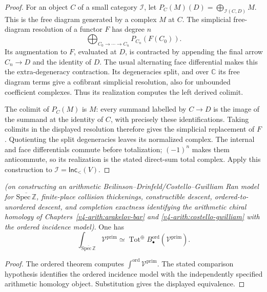 \begin{proof}
For an object \(C\) of a small category \(\mathcal I\), let
\(P_C(M)(D)=\bigoplus_{\mathcal I(C,D)}M\). This is the free
diagram generated by a complex \(M\) at \(C\). The simplicial
free-diagram resolution of a functor \(F\) has degree \(n\)
\[
 \bigoplus_{C_0\to\cdots\to C_n}P_{C_n}(F(C_0)).
\]
Its augmentation to \(F\), evaluated at \(D\), is contracted
by appending the final arrow \(C_n\to D\) and the identity
of \(D\). The usual alternating face differential makes this
the extra-degeneracy contraction. Its degeneracies split, and
over \(\mathbb C\) its free diagram terms give a cofibrant
simplicial resolution, also for unbounded coefficient complexes.
Thus its realization computes the left derived colimit.

The colimit of \(P_C(M)\) is \(M\): every summand labelled by
\(C\to D\) is the image of the summand at the identity of
\(C\), with precisely these identifications. Taking colimits in
the displayed resolution therefore gives the simplicial replacement
of \(F\). Quotienting the split degeneracies leaves its normalized
complex. The internal and face differentials commute before
totalization; \((-1)^n\) makes them anticommute, so its
realization is the stated direct-sum total complex. Apply this
construction to \(\mathcal I=\mathsf{Inc}_{<}(V)\).
\end{proof}

\begin{corollary}
\label{v4-arith:3d-acs:cor:BDCG-ordered-comparison}
\ClaimStatusConditional \emph{(on constructing an arithmetic
Beilinson--Drinfeld/Costello--Gwilliam Ran model for
\(\overline{\mathrm{Spec}\,\mathbb Z}\), finite-place collision
thickenings, constructible descent, ordered-to-unordered descent, and
completion exactness identifying the arithmetic chiral homology of
Chapters~\ref{v4-arith:arakelov-bar} and
\ref{v4-arith:costello-gwilliam} with the ordered incidence model)}.
One has
\[
\int_{\overline{\mathrm{Spec}\,\mathbb Z}}\mathcal V^{\mathrm{prim}}
\simeq
\operatorname{Tot}^{\oplus}
       B^{\mathrm{ord}}_{\bullet}(\mathcal V^{\mathrm{prim}}).
\]
\end{corollary}

\begin{proof}
The ordered theorem computes
\(\int^{\mathrm{ord}}\mathcal V^{\mathrm{prim}}\). The stated
comparison hypothesis identifies the ordered incidence model with
the independently specified arithmetic homology object. Substitution gives the
displayed equivalence.
\end{proof}


